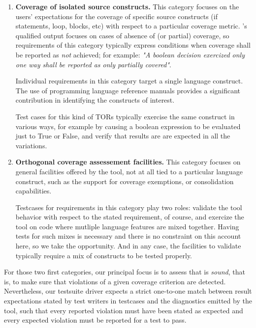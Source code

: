 \documentclass {report}
\begin{document}
\begin{enumerate}
\item \textbf{Coverage of isolated source constructs.}
%
This category focuses on the users' expectations for the coverage of
specific source constructs (if statements, loop, blocks, etc) with respect to
a particular coverage metric.
%
\xcov{}'s qualified output focuses on cases of absence of (or partial)
coverage, so requirements of this category typically express conditions when
coverage shall be reported as \emph{not} achieved;
%
for example: \emph{"A boolean decision exercized only one way shall be
reported as only partially covered"}.

Individual requirements in this category target a single language construct.
%
The use of programming language reference manuals provides a significant
contribution in identifying the constructs of interest.

Test cases for this kind of TORs typically exercise the same construct in
various ways, for example by causing a boolean expression to be evaluated just
to True or False, and verify that results are are expected in all the
variations.

\item \textbf{Orthogonal coverage assessement facilities.}
%
This category focuses on general facilities offered by the tool, not at all
tied to a particular language construct, such as the support for coverage
exemptions, or consolidation capabilities.

Testcases for requirements in this category play two roles: validate the tool
behavior with respect to the stated requirement, of course, and exercize the
tool on code where mutliple language features are mixed together.
%
Having tests for such mixes is necessary and there is no constraint on this
account here, so we take the opportunity.
% 
And in any case, the facilities to validate typically require a mix of
constructs to be tested properly.
\end{enumerate}

For those two first categories, our principal focus is to assess that \xcov{}
is \emph{sound}, that is, to make sure that violations of a given coverage
criterion are detected.
%
Nevertheless, our testsuite driver expects a strict one-to-one match between
result expectations stated by test writers in testcases and the diagnostics
emitted by the tool, such that every reported violation must have been stated
as expected and every expected violation must be reported for a test to pass.
\end{document}
